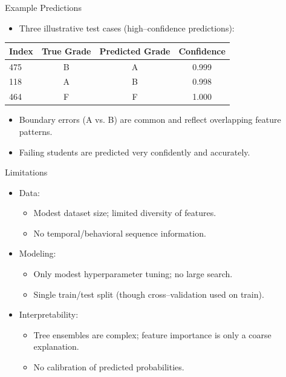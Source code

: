 \documentclass[aspectratio=169]{beamer}
\begin{document}
\begin{frame}{Example Predictions}
  \begin{itemize}
    \item Three illustrative test cases (high--confidence predictions):
  \end{itemize}
  \begin{center}
    \begin{tabular}{lccc}
      \toprule
      Index & True Grade & Predicted Grade & Confidence \\
      \midrule
      475 & B & A & 0.999 \\
      118 & A & B & 0.998 \\
      464 & F & F & 1.000 \\
      \bottomrule
    \end{tabular}
  \end{center}
  \vspace{0.5em}
  \begin{itemize}
    \item Boundary errors (A vs. B) are common and reflect overlapping feature patterns.
    \item Failing students are predicted very confidently and accurately.
  \end{itemize}
\end{frame}

\begin{frame}{Limitations}
  \begin{itemize}
    \item Data:
    \begin{itemize}
      \item Modest dataset size; limited diversity of features.
      \item No temporal/behavioral sequence information.
    \end{itemize}
    \item Modeling:
    \begin{itemize}
      \item Only modest hyperparameter tuning; no large search.
      \item Single train/test split (though cross--validation used on train).
    \end{itemize}
    \item Interpretability:
    \begin{itemize}
      \item Tree ensembles are complex; feature importance is only a coarse explanation.
      \item No calibration of predicted probabilities.
    \end{itemize}
  \end{itemize}
\end{frame}
\end{document}
